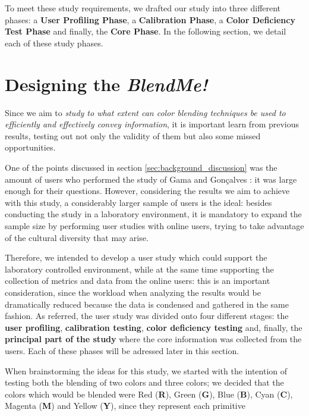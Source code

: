 \\ \\
%
To meet these study requirements, we drafted our study into three different phases: a \textbf{User Profiling Phase},
a \textbf{Calibration Phase}, a \textbf{Color Deficiency Test Phase} and finally, the \textbf{Core Phase}. In the
following section, we detail each of these study phases. \par
%
\section{Designing the \emph{BlendMe!}}
\label{sec:impl_designingsolution}
%
Since we aim to \emph{study to what extent can color blending techniques be used to efficiently and effectively
convey information}, it is important learn from previous results, testing out not only the validity of them but also
some missed opportunities. \par
%
One of the points discussed in section \ref{sec:background_discussion} was the amount of users who performed the study
of Gama and Gonçalves \cite{Gama20141,Gama20142}: it was large enough for their questions. However, considering the
results we aim to achieve with this study, a considerably larger sample of users is the ideal: besides conducting
the study in a laboratory environment, it is mandatory to expand the sample size by performing user studies with
online users, trying to take advantage of the cultural diversity that may arise. \par
%
Therefore, we intended to develop a user study which could support the laboratory controlled environment, while at
the same time supporting the collection of metrics and data from the online users: this is an important consideration,
since the workload when analyzing the results would be dramatically reduced because the data is condensed and gathered
in the same fashion. As referred, the user study was divided onto four different stages: the \textbf{user profiling},
\textbf{calibration testing}, \textbf{color deficiency testing} and, finally, the \textbf{principal part of the study}
where the core information was collected from the users. Each of these phases will be adressed later in this section. \par
%
When brainstorming the ideas for this study, we started with the intention of testing both the blending of two colors and
three colors; we decided that the colors which would be blended were Red (\textbf{R}), Green (\textbf{G}),
Blue (\textbf{B}), Cyan (\textbf{C}), Magenta (\textbf{M}) and Yellow (\textbf{Y}), since they represent each primitive
